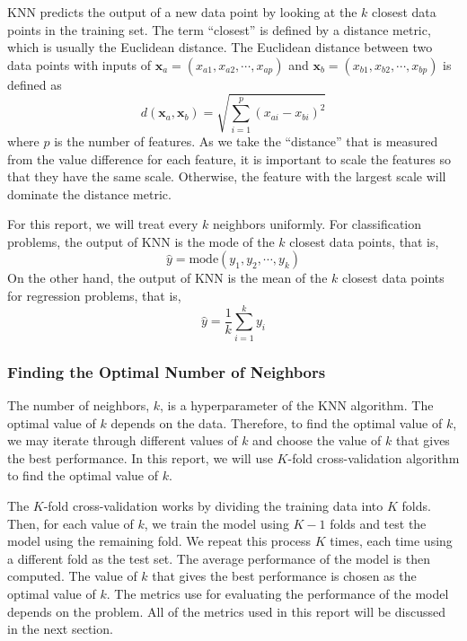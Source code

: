 \documentclass[conf]{new-aiaa}
\begin{document}
KNN predicts the output of a new data point by looking at the $k$ closest data points in the training set. The term ``closest'' is defined by a distance metric, which is usually the Euclidean distance. The Euclidean distance between two data points with inputs of $\mathbf{x}_a = \left(x_{a1}, x_{a2}, \cdots, x_{ap}\right)$ and $\mathbf{x}_b = \left(x_{b1}, x_{b2}, \cdots, x_{bp}\right)$ is defined as
\begin{equation} \label{eq:eucliddist}
    d\left(\mathbf{x}_a, \mathbf{x}_b\right) = \sqrt{\sum_{i=1}^p \left(x_{ai} - x_{bi}\right)^2}
\end{equation}
where $p$ is the number of features. As we take the ``distance'' that is measured from the value difference for each feature, it is important to scale the features so that they have the same scale. Otherwise, the feature with the largest scale will dominate the distance metric.

For this report, we will treat every $k$ neighbors uniformly. For classification problems, the output of KNN is the mode of the $k$ closest data points, that is,
\begin{equation} \label{eq:knnclass}
    \hat{y} = \textrm{mode}\left(y_1, y_2, \cdots, y_k\right)
\end{equation}
On the other hand, the output of KNN is the mean of the $k$ closest data points for regression problems, that is,
\begin{equation} \label{eq:knnreg}
    \hat{y} = \frac{1}{k} \sum_{i=1}^k y_i
\end{equation}


\subsubsection{Finding the Optimal Number of Neighbors}
The number of neighbors, $k$, is a hyperparameter of the KNN algorithm. The optimal value of $k$ depends on the data. Therefore, to find the optimal value of $k$, we may iterate through different values of $k$ and choose the value of $k$ that gives the best performance. In this report, we will use $K$-fold cross-validation algorithm to find the optimal value of $k$.

The $K$-fold cross-validation works by dividing the training data into $K$ folds. Then, for each value of $k$, we train the model using $K-1$ folds and test the model using the remaining fold. We repeat this process $K$ times, each time using a different fold as the test set. The average performance of the model is then computed. The value of $k$ that gives the best performance is chosen as the optimal value of $k$. The metrics use for evaluating the performance of the model depends on the problem. All of the metrics used in this report will be discussed in the next section.
\end{document}
